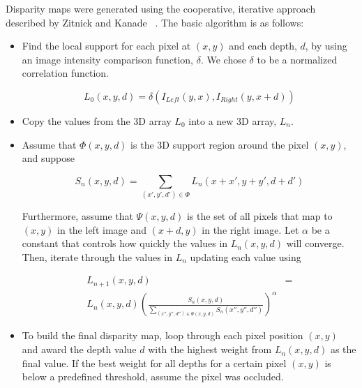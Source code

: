 \documentclass[a4paper,twoside]{article}
\begin{document}
Disparity maps were generated using the cooperative, iterative approach described by Zitnick and Kanade ~\cite{stereo:zitKan}.
The basic algorithm is as follows:
\begin{itemize}
\item Find the local support for each pixel at $(x,y)$ and each depth, $d$, by using an image intensity comparison function, $\delta$.
We chose $\delta$ to be a normalized correlation function.

\begin{equation}
L_0(x,y,d) = \delta(I_{Left}(y,x),I_{Right}(y,x+d))
\end{equation}

\item Copy the values from the 3D array $L_0$ into a new 3D array, $L_n$.

\item Assume that $\Phi(x,y,d)$ is the 3D support region around the pixel $(x,y)$, and suppose

\begin{equation}
S_n(x,y,d) = \sum_{(x',y',d') \in \Phi} L_n (x+x', y+y', d+d')
\end{equation}

Furthermore, assume that $\Psi(x,y,d)$ is the set of all pixels that map to $(x,y)$ in the left image and $(x+d,y)$ in the right image. 
Let $\alpha$ be a constant that controls how quickly the values in $L_n(x,y,d)$ will converge. Then, iterate through the values in $L_n$ updating each value using
 
\begin{align}
L_{n+1}(x,y,d) &= \\ 
L_n(x,y,d)\left(\frac{S_n(x,y,d)}{\sum\limits_{(x'',y'',d'') \in \Psi(x,y,d)} S_n(x'',y'',d'')} \right)^\alpha 
\end{align}

\item To build the final disparity map, loop through each pixel position $(x,y)$ and award the depth value $d$ with the highest weight from $L_n(x,y,d)$ as the final value.
If the best weight for all depths for a certain pixel $(x,y)$ is below a predefined threshold, assume the pixel was occluded.
\end{itemize}

\end{document}
